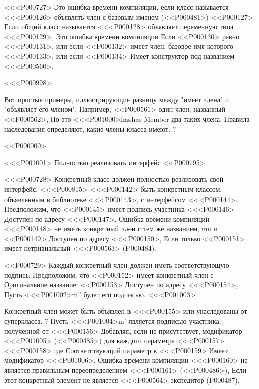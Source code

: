 {{{{{{{{{{{{{<<<P000727>%
Это ошибка времени компиляции, если класс называется <<<P000126> объявлять
член с базовым именем (<<P000481>) <<P000127>.
Если общий класс называется <<<P000128> объявляет переменную типа <<<P000129>,
Это ошибка времени компиляции
Если <<P000130> равно <<<P000131>,
или если <<P000132> имеет член, базовое имя которого <<<P000133>,
или если <<P000134> Имеет конструктор под названием <<<P000560>.

<<<P000998>{%
Вот простые примеры, иллюстрирующие разницу между
"имеет члена" и "объявляет его членом".
Например, <<P000561> 
один член, названный <<P000562>,
Но это <<<P001000>{has}{has Member} два таких члена.
Правила наследования определяют, какие члены класса имеют.
?

<<P000000>


<<<P001001> Полностью реализовать интерфейс
<<P000795>


<<<P000728>%
Конкретный класс должен полностью реализовать свой интерфейс.
<<<P000815>%
<<<P000142> быть конкретным классом, объявленным в библиотеке <<<P000143>, с интерфейсом <<<P000144>.
Предположим, что <<P000145> имеет подпись участника <<<P000146> Доступен по адресу <<<P000147>.
Ошибка времени компиляции <<<P000148> не иметь
конкретный член с тем же названием, что и <<P000149> Доступен по адресу <<<P000150>,
Если только <<P000151> имеет нетривиальный <<<P000563>
(P000484).

<<P000729>%
Каждый конкретный член должен иметь соответствующую подпись:
Предположим, что <<P000152> имеет конкретный член с
Оригинальное название: <<P000153> Доступен по адресу <<<P000154>,
Пусть <<<P001002>{m''} будет его подписью.
<<<P001003>{%
Конкретный член может быть объявлен в <<<P000155> или унаследованы от суперкласса.
?
Пусть <<<P001004>{m'} является подписью участника, полученной от <<<P000156>
Добавляя, если не присутствует, модификатор <<<P001005>
(<<P000485>)
для каждого параметра <<<P000157> <<<P000158> где
Соответствующий параметр в <<<P000159> Имеет модификатор <<<P001006>.
Ошибка времени компиляции <<<P000160> не является правильным переопределением <<<P000161>
(<<P000486>),
Если этот конкретный элемент не является <<<P000564> экспедитор
(P000487).

}}}}}}}}}}}}}}}
